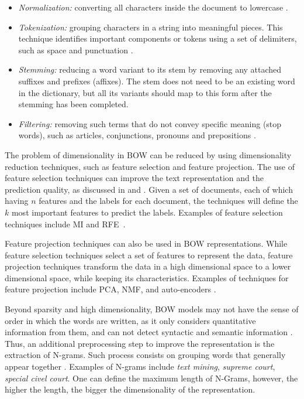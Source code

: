 \begin{itemize}[noitemsep]
    \item \textit{Normalization:} converting all characters inside the document to lowercase \cite{Jurafsky2019}.
    \item \textit{Tokenization:} grouping characters in a string into meaningful pieces. This technique identifies important components or tokens using a set of delimiters, such as space and punctuation \cite{Lee1999}.
    \item  \textit{Stemming:} reducing a word variant to its stem by removing any attached suffixes and prefixes (affixes). The stem does not need to be an existing word in the dictionary, but all its variants should map to this form after the stemming has been completed. 
    \item  \textit{Filtering:} removing such terms that do not convey specific meaning (stop words), such as articles, conjunctions, pronouns and prepositions \cite{Kotu2019}.
\end{itemize}


The problem of dimensionality in BOW can be reduced by using dimensionality reduction techniques, such as feature selection and feature projection.
The use of feature selection techniques can improve the text representation and the prediction quality, as discussed in \textcite{Chandrashekar2014} and \textcite{Guyon2003}. Given a set of documents, each of which having $n$ features and the labels for each document, the techniques will define the $k$ most important features to predict the labels. Examples of feature selection techniques include \gls{MI} and \gls{RFE}~\cite{Guyon2003}.

Feature projection techniques can also be used in \gls{BOW} representations. While feature selection techniques select a set of features to represent the data, feature projection techniques transform the data in a high dimensional space to a lower dimensional space, while keeping its characteristics. Examples of techniques for feature projection include \gls{PCA}, \gls{NMF}, and auto-encoders \cite{Jolliffe2016, Guyon2003, Meng2018}. 



Beyond  sparsity and high dimensionality, \gls{BOW} models may not have the sense of order in which the words are written, as it only considers quantitative information from them, and can not detect syntactic and semantic information \cite{Kowsari2019}. Thus, an additional preprocessing step to improve the representation is the extraction of N-grams. Such process consists on grouping words that generally appear together \cite{Kotu2019}. Examples of N-grams include \textit{text mining}, \textit{supreme court}, \textit{special civel court}. One can define the maximum length of N-Grams, however, the higher the length, the bigger the dimensionality of the representation. 


